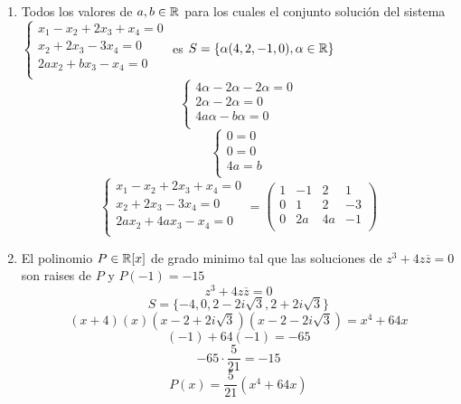 \documentclass[../practica.root.tex]{subfiles}
\begin{document}
\begin{enumerate}
    \item Todos los valores de $a, b \in \mathbb{R}$ para los cuales el conjunto solución del sistema $\begin{cases}
              x_1 - x_2 + 2x_3 + x_4 = 0 \\
              x_2 + 2x_3 - 3x_4 = 0      \\
              2ax_2 + bx_3 - x_4 = 0     \\
          \end{cases}$ es $S = \{\alpha(4,2,-1,0), \alpha \in \mathbb{R}\}$
          \[
              \begin{cases}
                  4\alpha - 2\alpha - 2\alpha = 0 \\
                  2\alpha - 2\alpha = 0           \\
                  4a\alpha -b\alpha = 0           \\
              \end{cases}
          \] \[
              \begin{cases}
                  0 = 0  \\
                  0 = 0  \\
                  4a = b \\
              \end{cases}
          \] \[
              \begin{cases}
                  x_1 - x_2 + 2x_3 + x_4 = 0 \\
                  x_2 + 2x_3 - 3x_4 = 0      \\
                  2ax_2 + 4ax_3 - x_4 = 0    \\
              \end{cases}
              =
              \begin{pmatrix}
                  1 & -1 & 2  & 1  \\
                  0 & 1  & 2  & -3 \\
                  0 & 2a & 4a & -1 \\
              \end{pmatrix}
          \]

    \item El polinomio $P \in \mathbb{R}[x]$ de grado minimo tal que las soluciones de $z^3 + 4z\overline{z} = 0$ son raises de $P$ y $P(-1) = -15$
          \[ z^3 + 4z\overline{z} = 0 \]
          \[ S = \{ -4, 0, 2-2i\sqrt{3}, 2+2i\sqrt{3} \} \]
          \[ (x+4)(x)(x-2+2i\sqrt{3})(x-2-2i\sqrt{3}) = x^4 + 64x \]
          \[ (-1)+64(-1) = -65 \]
          \[ -65\cdot\frac{5}{21} = -15 \]
          \[ \boxed{P(x) = \frac{5}{21}(x^4 + 64x)} \]



\end{enumerate}
\end{document}
